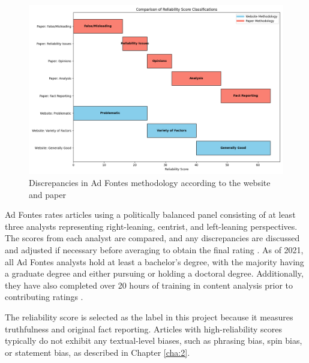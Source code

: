 \begin{figure}[htbp]
    \centering
    \includegraphics[width=0.9\linewidth]{figures/ad_fontes_reliability_score_methodology.png}
    \caption{Discrepancies in Ad Fontes methodology according to the website \cite{adfontes-bias-reliability} and paper \cite{otero-2021-adfontes-methodology}}
    \label{fig:adfontes-methodology}
\end{figure}

Ad Fontes rates articles using a politically balanced panel consisting of at least three analysts representing right-leaning, centrist, and left-leaning perspectives. The scores from each analyst are compared, and any discrepancies are discussed and adjusted if necessary before averaging to obtain the final rating \cite{adfontes-methodology,otero-2021-adfontes-methodology}. As of 2021, all Ad Fontes analysts hold at least a bachelor's degree, with the majority having a graduate degree and either pursuing or holding a doctoral degree. Additionally, they have also completed over 20 hours of training in content analysis prior to contributing ratings \cite{otero-2021-adfontes-methodology}.

The reliability score is selected as the label in this project because it measures truthfulness and original fact reporting. Articles with high-reliability scores typically do not exhibit any textual-level biases, such as phrasing bias, spin bias, or statement bias, as described in Chapter \ref{cha:2}.

